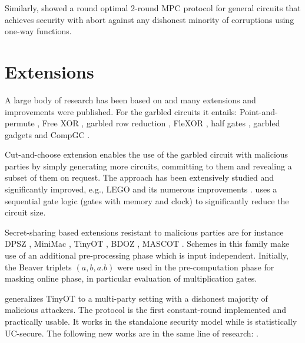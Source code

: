 \documentclass[
  digital, %
  twoside, %
  table,   %
  lof,     %
  lot,     %
]{fithesis3}
\newcounter{ph4_show_guides}
\theoremstyle{definition}
\theoremstyle{remark}
\begin{document}
Similarly, \cite{cryptoeprint:2018:572} showed a round optimal 2-round MPC protocol for general circuits that achieves security with abort against any dishonest minority of corruptions using one-way functions.

\section{Extensions}\label{sec:soa:extensions}%
A large body of research has been based on \cite{Yao86, GMW87, BGW88, CCD88} and many extensions and improvements were published. 
For the garbled circuits it entails: Point-and-permute \cite{BMR90}, Free XOR \cite{KS08}, garbled row reduction \cite{NPS99, PSSW09}, FleXOR \cite{KMR14}, half gates \cite{ZRE14}, garbled gadgets \cite{BMR16} and CompGC \cite{cryptoeprint:2016:458}.

Cut-and-choose extension \cite{LP07,LP11,Lin16} enables the use of the garbled circuit with malicious parties by simply generating more circuits, committing to them and revealing a subset of them on request. The approach has been extensively studied and significantly improved, e.g., LEGO \cite{NO09} and its numerous improvements \cite{cryptoeprint:2013:155, FJNT15, cryptoeprint:2016:1069, cryptoeprint:2017:226, KNBTR17, cryptoeprint:2018:578}.
\cite{SHSSK15} uses a sequential gate logic (gates with memory and clock) to significantly reduce the circuit size. %

Secret-sharing based extensions resistant to malicious parties are for instance DPSZ \cite{DPSZ12, cryptoeprint:2012:642}, MiniMac \cite{DZ13}, TinyOT \cite{NNOB12}, BDOZ \cite{BDOZ11}, MASCOT \cite{KOS16}. Schemes in this family make use of an additional pre-processing phase which is input independent. Initially, the Beaver triplets \cite{B91a} $(a,b,a.b)$ were used in the pre-computation phase for masking online phase, in particular evaluation of multiplication gates.

\cite{WRK17} generalizes TinyOT to a multi-party setting with a dishonest majority of malicious attackers. The protocol is the first constant-round implemented and practically usable. It works in the standalone security model while \cite{DPSZ12} is statistically UC-secure. The following new works are in the same line of research: \cite{FKOS15, DZ16, LPJ17, BCGIM17, cryptoeprint:2017:1230}.
%
\end{document}

